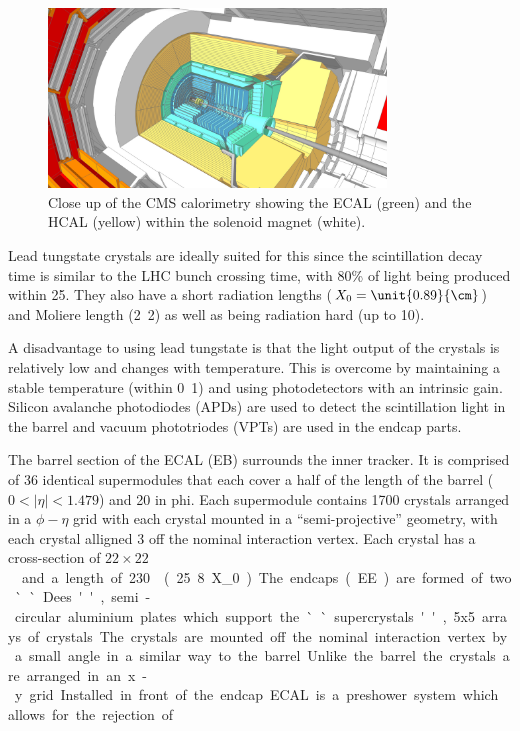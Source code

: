 \begin{figure}[htbp]
  \centering
  \includegraphics[width=0.8\textwidth]{hcal.png}
  \caption{Close up of the CMS calorimetry showing the ECAL (green) and the HCAL
(yellow) within the solenoid magnet (white).}
  \label{fig:calo}
\end{figure}

Lead tungstate crystals are ideally suited for this since the scintillation
decay time is similar to the LHC bunch crossing time, 
with \unit{80}{\%} of light being produced within \unit{25}{\ns}.
They also have a short radiation lengths ($X_0=\unit{0.89}{\cm}$) 
and Moliere length (\unit{2.2}{\cm}) as well as being radiation hard
(up to \unit{10}{\mrad}).

A disadvantage to using lead tungstate is that the light output of the crystals
is relatively low and changes with temperature. This is overcome by maintaining
a stable temperature (within \unit{0.1}{\degreecelsius}) and using
photodetectors with an intrinsic gain.
Silicon avalanche photodiodes (APDs) are used to detect the scintillation light
in the barrel and vacuum phototriodes (VPTs) are used in the endcap parts.

The barrel section of the ECAL (EB) surrounds the inner tracker. It is comprised
of 36 identical supermodules that each cover a half of the length of the barrel
($0<|\eta|<1.479$) and \unit{20}{\degree} in phi. Each supermodule contains
1700 crystals arranged in a $\phi - \eta$ grid with each crystal mounted in a
``semi-projective'' geometry, with each crystal alligned \unit{3}{\degree} off the
nominal interaction vertex. Each crystal has a cross-section of
\unit{$22 \times 22$}{\mm\squared} and a length of
\unit{230}{\mm} (\unit{25.8}{X_0}).

The endcaps (EE) are formed of two ``Dees'', semi-circular aluminium plates
which support the ``supercrystals'', 5x5 arrays of crystals. The crystals are
mounted off the nominal interaction vertex by a small angle in a similar way
to the barrel. 
Unlike the barrel the crystals are arranged in an x-y grid.
Installed in front of the endcap ECAL is a preshower system which allows for
the rejection of \Ppizero .\cite{cms}

